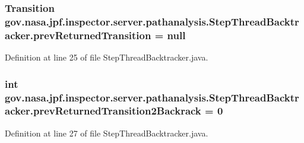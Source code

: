 \subsubsection[{\texorpdfstring{prev\+Returned\+Transition}{prevReturnedTransition}}]{\setlength{\rightskip}{0pt plus 5cm}Transition gov.\+nasa.\+jpf.\+inspector.\+server.\+pathanalysis.\+Step\+Thread\+Backtracker.\+prev\+Returned\+Transition = null\hspace{0.3cm}{\ttfamily [private]}}\hypertarget{classgov_1_1nasa_1_1jpf_1_1inspector_1_1server_1_1pathanalysis_1_1_step_thread_backtracker_a5dcbd27843c14be6bec9227a05d0a7e1}{}\label{classgov_1_1nasa_1_1jpf_1_1inspector_1_1server_1_1pathanalysis_1_1_step_thread_backtracker_a5dcbd27843c14be6bec9227a05d0a7e1}


Definition at line 25 of file Step\+Thread\+Backtracker.\+java.

\subsubsection[{\texorpdfstring{prev\+Returned\+Transition2\+Backrack}{prevReturnedTransition2Backrack}}]{\setlength{\rightskip}{0pt plus 5cm}int gov.\+nasa.\+jpf.\+inspector.\+server.\+pathanalysis.\+Step\+Thread\+Backtracker.\+prev\+Returned\+Transition2\+Backrack = 0\hspace{0.3cm}{\ttfamily [private]}}\hypertarget{classgov_1_1nasa_1_1jpf_1_1inspector_1_1server_1_1pathanalysis_1_1_step_thread_backtracker_aed03e6fe8f1c61ae04ce170b4a9ce4ff}{}\label{classgov_1_1nasa_1_1jpf_1_1inspector_1_1server_1_1pathanalysis_1_1_step_thread_backtracker_aed03e6fe8f1c61ae04ce170b4a9ce4ff}


Definition at line 27 of file Step\+Thread\+Backtracker.\+java.

